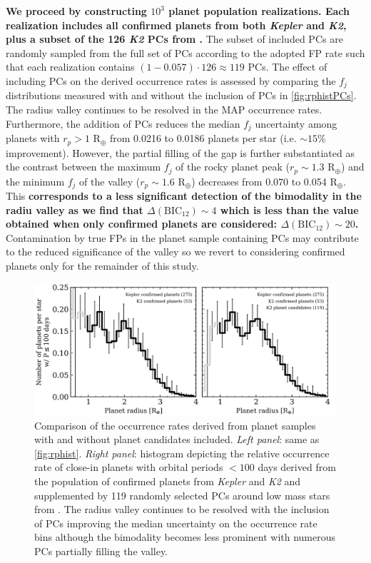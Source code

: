 \documentclass[twocolumn]{emulateapj}
\newcommand{\kepler}[1]{\emph{Kepler}#1}
\newcommand{\ktwo}[1]{\emph{K2}#1}
\begin{document}
\textbf{We proceed by constructing $10^3$ planet population realizations. Each realization
  includes all confirmed planets from both \kepler{} and \ktwo{,} plus a subset of the 126 \ktwo{} PCs from
\cite{kruse19}.} The subset of included PCs are randomly sampled from the full set of PCs
according to the adopted FP rate such that each realization contains $(1-0.057)\cdot 126 \approx 119$ PCs.
The effect of including PCs on the derived occurrence rates is assessed by comparing the $f_j$ distributions
measured with and without the inclusion of PCs in \autoref{fig:rphistPCs}. The radius valley continues to be resolved in
the MAP occurrence rates. Furthermore, the addition of PCs reduces the median $f_j$ uncertainty among planets
with $r_p>1$ R$_{\oplus}$ from
0.0216 to 0.0186 planets per star (i.e. $\sim 15$\% improvement). However, the partial filling of the gap is
further substantiated as the contrast between the maximum $f_j$ of the rocky planet peak ($r_p \sim 1.3$ R$_{\oplus}$)
and the minimum $f_j$ of the valley ($r_p \sim 1.6$ R$_{\oplus}$) decreases from 0.070 to 0.054 R$_{\oplus}$. This
\textbf{corresponds to a less significant detection of the bimodality in the radiu valley as we find that
$\Delta(\text{BIC}_{12})\sim 4$ which is less than the value obtained when only confirmed planets are considered:
$\Delta(\text{BIC}_{12})\sim 20$.} Contamination by true FPs in the planet sample containing
PCs may contribute to the reduced significance of the valley so we revert to considering confirmed planets only
for the remainder of this study.

\begin{figure}
  \centering
  \includegraphics[scale=.8]{figures/rphist_kruse.png}
  \caption{Comparison of the occurrence rates derived from planet samples with and without planet
    candidates included. \emph{Left panel}:
    same as \autoref{fig:rphist}. \emph{Right panel}: histogram depicting the relative occurrence
    rate of close-in planets with orbital periods $<100$ days derived from the population of confirmed
    planets from \kepler{} and \ktwo{} and supplemented by 119 randomly selected PCs
    around low mass stars from \cite{kruse19}. The radius valley continues to be resolved with
    the inclusion of PCs improving the median uncertainty on the occurrence rate bins although the
    bimodality becomes less prominent with numerous PCs partially filling the valley.}
  \label{fig:rphistPCs}
\end{figure}
\end{document}
